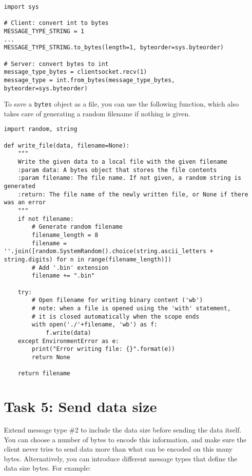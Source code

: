 \begin{lstlisting}[style=python]
import sys

# Client: convert int to bytes
MESSAGE_TYPE_STRING = 1
...
MESSAGE_TYPE_STRING.to_bytes(length=1, byteorder=sys.byteorder)

# Server: convert bytes to int
message_type_bytes = clientsocket.recv(1)
message_type = int.from_bytes(message_type_bytes, byteorder=sys.byteorder)
\end{lstlisting}  

To save a \texttt{bytes} object as a file, you can use the following function, which also takes care of generating a random filename if nothing is given.

\begin{lstlisting}[style=python]
import random, string

def write_file(data, filename=None):
    """
    Write the given data to a local file with the given filename
    :param data: A bytes object that stores the file contents
    :param filename: The file name. If not given, a random string is generated
    :return: The file name of the newly written file, or None if there was an error
    """
    if not filename:
        # Generate random filename
        filename_length = 8
        filename = ''.join([random.SystemRandom().choice(string.ascii_letters + string.digits) for n in range(filename_length)])
        # Add '.bin' extension
        filename += ".bin"
    
    try:
        # Open filename for writing binary content ('wb')
        # note: when a file is opened using the 'with' statement, 
        # it is closed automatically when the scope ends
        with open('./'+filename, 'wb') as f:
            f.write(data)
    except EnvironmentError as e:
        print("Error writing file: {}".format(e))
        return None
    
    return filename
  \end{lstlisting}

\section*{Task 5: Send data size}

Extend message type \#2 to include the data size before sending the data itself. You can choose a number of bytes to encode this information, and make sure the client never tries to send data more than what can be encoded on this many bytes. Alternatively, you can introduce different message types that define the data size bytes. For example:


